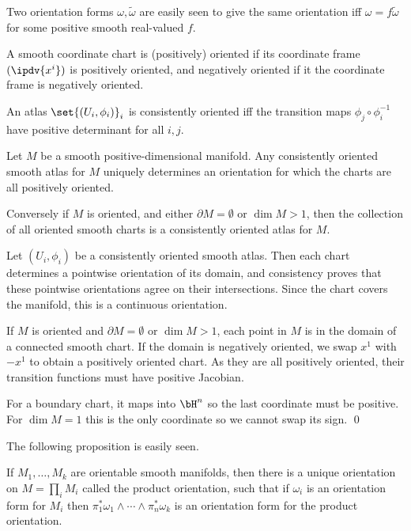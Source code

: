 \edefn

Two orientation forms $\omega,\tilde\omega$ are easily seen to give the same orientation iff $\omega=f\tilde\omega$ for some
positive smooth real-valued $f$.

\bdefn

    A smooth coordinate chart is {\emphcolor (positively) oriented} if its coordinate frame $(\ipdv{x^i})$ is positively
    oriented, and {\emphcolor negatively oriented} if it the coordinate frame is negatively oriented.

    An atlas $\set{(U_i,\phi_i)}_i$ is {\emphcolor consistently oriented} iff the transition maps $\phi_j\circ\phi_i^{-1}$
    have positive determinant for all $i,j$.

\edefn

\bprop

    Let $M$ be a smooth positive-dimensional manifold.
    Any consistently oriented smooth atlas for $M$ uniquely determines an orientation for which the charts are
    all positively oriented.

    Conversely if $M$ is oriented, and either $\partial M=\emptyset$ or $\dim M>1$, then the collection of all oriented smooth
    charts is a consistently oriented atlas for $M$.

\eprop

\bproof

    Let $(U_i,\phi_i)$ be a consistently oriented smooth atlas.
    Then each chart determines a pointwise orientation of its domain, and consistency proves that these pointwise orientations
    agree on their intersections.
    Since the chart covers the manifold, this is a continuous orientation.

    If $M$ is oriented and $\partial M=\emptyset$ or $\dim M>1$, each point in $M$ is in the domain of a connected smooth chart.
    If the domain is negatively oriented, we swap $x^1$ with $-x^1$ to obtain a positively oriented chart.
    As they are all positively oriented, their transition functions must have positive Jacobian.

    For a boundary chart, it maps into $\bH^n$ so the last coordinate must be positive.
    For $\dim M=1$ this is the only coordinate so we cannot swap its sign.
    \qed

\eproof

The following proposition is easily seen.

\bprop

    If $M_1,\dots,M_k$ are orientable smooth manifolds, then there is a unique orientation on $M=\prod_iM_i$
    called the {\emphcolor product orientation}, such that if $\omega_i$ is an orientation form for $M_i$
    then $\pi_1^*\omega_1\wedge\cdots\wedge\pi_n^*\omega_k$ is an orientation form for the product orientation.

